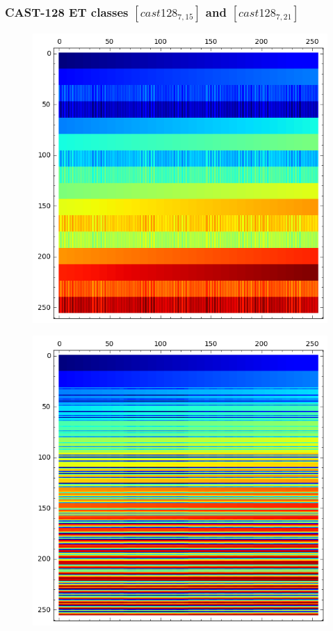 \documentclass[pdf,sprung,slideColor,nocolorBG]{beamer}
\newenvironment{colortheme}[1]{
\def\ProvidesPackageRCS $##1${\relax}
\renewcommand{\ProcessOptions}{\relax}
\makeatletter

\makeatother
}{}
\begin{document}
\begin{colortheme}{jubata}
\begin{frame}
\frametitle{CAST-128 ET classes $[cast128_{7,15}]$ and $[cast128_{7,21}]$}
\begin{figure}
\centering
\begin{minipage}{.48\textwidth}
  \centering
\includegraphics[width=.9\linewidth]{../matrix_plot/cast128_7_15_bent_cayley_graph_index_matrix.png}
  \label{fig:cast128_7_15_bent_cayley_graph_index_matrix}
\end{minipage}%
\begin{minipage}{.48\textwidth}
  \centering
\includegraphics[width=.9\linewidth]{../matrix_plot/cast128_7_21_bent_cayley_graph_index_matrix.png}

\end{minipage}
\end{figure}
\end{frame}
\end{colortheme}
\end{document}
